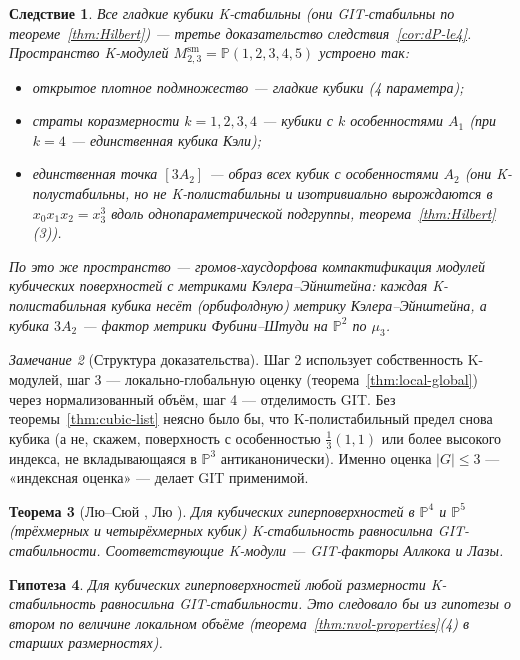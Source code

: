 \documentclass[11pt,a4paper]{article}
\theoremstyle{plain}
\newtheorem{theorem}{Теорема}[section]
\newtheorem{corollary}[theorem]{Следствие}
\newtheorem{conjecture}[theorem]{Гипотеза}
\theoremstyle{definition}
\theoremstyle{remark}
\newtheorem{remark}[theorem]{Замечание}
\newcommand{\PP}{\mathbb{P}}
\newcommand{\sm}{\mathrm{sm}}
\begin{document}
\begin{corollary}\label{cor:cubic-moduli}
Все гладкие кубики K-стабильны \textup{(}они GIT-стабильны по теореме~\ref{thm:Hilbert}\textup{)} --- третье
доказательство следствия~\ref{cor:dP-le4}. Пространство K-модулей $M^{\sm}_{2,3}=\PP(1,2,3,4,5)$
устроено так:
\begin{itemize}
\item открытое плотное подмножество --- гладкие кубики \textup{(}4 параметра\textup{)};
\item страты коразмерности $k=1,2,3,4$ --- кубики с $k$ особенностями $A_1$ \textup{(}при $k=4$ ---
единственная кубика Кэли\textup{)};
\item единственная точка $[3A_2]$ --- образ всех кубик с особенностями $A_2$ \textup{(}они K-полустабильны,
но не K-полистабильны и изотривиально вырождаются в $x_0x_1x_2=x_3^3$ вдоль однопараметрической
подгруппы, теорема~\ref{thm:Hilbert}\textup{(}3\textup{)}\textup{)}.
\end{itemize}
По \cite{OSS} это же пространство --- громов-хаусдорфова компактификация модулей кубических
поверхностей с метриками Кэлера--Эйнштейна: каждая K-полистабильная кубика несёт \textup{(}орбифолдную\textup{)} метрику Кэлера--Эйнштейна, а кубика $3A_2$ ---
фактор метрики Фубини--Штуди на $\PP^2$ по $\mu_3$.
\end{corollary}

\begin{remark}[Структура доказательства]
Шаг 2 использует собственность K-модулей, шаг 3 --- локально-глобальную оценку
(теорема~\ref{thm:local-global}) через нормализованный объём, шаг 4 --- отделимость GIT. Без
теоремы~\ref{thm:cubic-list} неясно было бы, что K-полистабильный предел снова кубика (а не,
скажем, поверхность с особенностью $\frac13(1,1)$ или более высокого индекса, не вкладывающаяся в
$\PP^3$ антиканонически). Именно оценка $|G|\le3$ --- «индексная оценка» --- делает GIT
применимой.
\end{remark}

\begin{theorem}[{Лю--Сюй \cite{LX19}, Лю \cite{Liu22}}]
Для кубических гиперповерхностей в $\PP^4$ и $\PP^5$ \textup{(}трёхмерных и четырёхмерных кубик\textup{)}
K-стабильность равносильна GIT-стабильности. Соответствующие K-модули --- GIT-факторы Аллкока и Лазы.
\end{theorem}

\begin{conjecture}
Для кубических гиперповерхностей любой размерности K-стабильность равносильна GIT-стабильности. Это следовало бы из
гипотезы о втором по величине локальном объёме \textup{(}теорема~\ref{thm:nvol-properties}\textup{(}4\textup{)} в старших
размерностях\textup{)}.
\end{conjecture}
\end{document}
